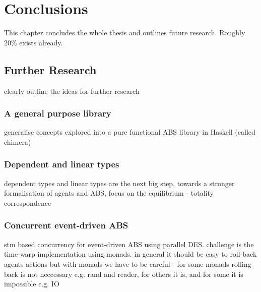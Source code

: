 \chapter{Conclusions}
\label{ch:conclusions}

This chapter concludes the whole thesis and outlines future research. Roughly 20\% exists already.


\section{Further Research}
clearly outline the ideas for further research

\subsection{A general purpose library}
generalise concepts explored into a pure functional ABS library in Haskell (called chimera)

\subsection{Dependent and linear types}
dependent types and linear types are the next big step, towards a stronger formalisation of agents and ABS,
focus on the equilibrium - totality correspondence

\subsection{Concurrent event-driven ABS}
stm based concurrency for event-driven ABS using parallel DES. challenge is the time-warp implementation using monads. in general it should be easy to roll-back agents actions but with monads we have to be careful - for some monads rolling back is not neccessary e.g. rand and reader, for others it is, and for some it is impossible e.g. IO